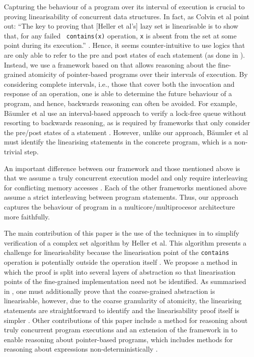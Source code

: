 \documentclass{article}
\theoremstyle{plain}
\newcounter{thm}
\theoremstyle{definition}
\begin{document}
Capturing the behaviour of a program over its interval of execution is
crucial to proving linearisability of concurrent data structures. In
fact, as Colvin et al point out: ``The key to proving that [Heller et
al's] lazy set is linearisable is to show that, for any failed {\tt
  contains(x)} operation, {\tt x} is absent from the set at some point
during its execution.''  \cite{CGLM06}.  Hence, it seems
counter-intuitive to use logics that are only able to refer to the pre
and post states of each statement (as done in
\cite{VHHS06,CGLM06,DSW11,Vaf10}). Instead, we use a framework based
on \cite{DDH12} that allows reasoning about the fine-grained atomicity
of pointer-based programs over their intervals of execution. By
considering complete intervals, i.e., those that cover both the
invocation and response of an operation, one is able to determine the
future behaviour of a program, and hence, backwards reasoning can
often be avoided. For example, B{\"a}umler et al \cite{BSTR11} use an interval-based
approach to verify a lock-free queue without resorting to backwards
reasoning, as is required by frameworks that only consider the
pre/post states of a statement \cite{DGLM04}. However, unlike our
approach, B{\"a}umler et al must identify the linearising statements
in the concrete program, which is a non-trivial step.

An important difference between our framework and those mentioned
above is that we assume a truly concurrent execution model and only
require interleaving for conflicting memory accesses
\cite{DD12,DDH12}. Each of the other frameworks mentioned above assume
a strict interleaving between program statements. Thus, our approach
captures the behaviour of program in a multicore/multiprocesor
architecture more faithfully.  

The main contribution of this paper is the use of the techniques in
\cite{DD12} to simplify verification of a complex set algorithm by
Heller et al. This algorithm presents a challenge for linearisability
because the linearisation point of the {\tt contains} operation is
potentially outside the operation itself \cite{DSW11}. We propose a
method in which the proof is split into several layers of abstraction
so that linearisation points of the fine-grained implementation need
not be identified. As summarised in , one must
additionally prove that the coarse-grained abstraction is
linearisable, however, due to the coarse granularity of atomicity, the
linearising statements are straightforward to identify and the
linearisability proof itself is simpler \cite{DD12}. Other
contributions of this paper include a method for reasoning about truly
concurrent program executions and an extension of the framework in
\cite{DDH12} to enable reasoning about pointer-based programs, which
includes methods for reasoning about expressions non-deterministically
\cite{HBDJ13}.
\end{document}
